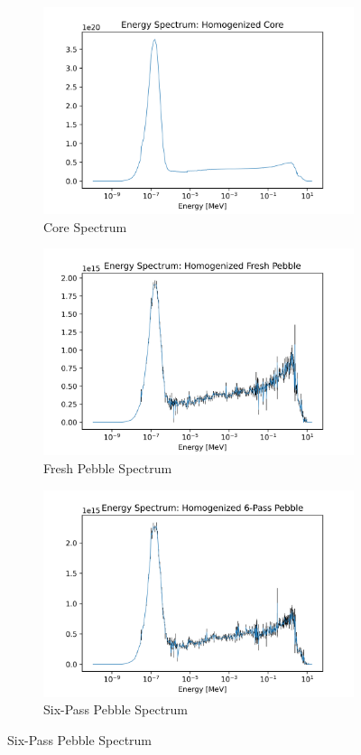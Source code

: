 \begin{figure}[h!]
\centering
%
\begin{subfigure}{0.25\textwidth}
  \includegraphics[width=0.95\linewidth]{figures/core_spec_homog}
  \caption{Core Spectrum}
  \label{fig:hom-core}
\end{subfigure}%
%
\begin{subfigure}{0.25\textwidth}
  \includegraphics[width=0.95\linewidth]{figures/fresh_spec_homog}
  \caption{Fresh Pebble Spectrum}
  \label{fig:hom-fresh}
\end{subfigure}%
%
\begin{subfigure}{0.25\textwidth}
  \includegraphics[width=0.95\linewidth]{figures/6_spec_homog}
  \caption{Six-Pass Pebble Spectrum}
  \label{fig:hom-six}
\end{subfigure}%


\end{figure}
